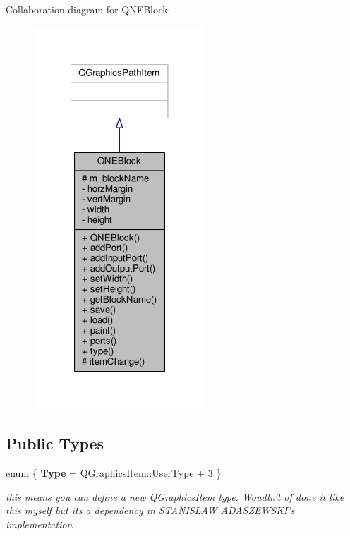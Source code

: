 Collaboration diagram for Q\-N\-E\-Block\-:
\nopagebreak
\begin{figure}[H]
\begin{center}
\leavevmode
\includegraphics[width=182pt]{class_q_n_e_block__coll__graph}
\end{center}
\end{figure}
\subsection*{Public Types}
\begin{DoxyCompactItemize}
\item 
enum \{ {\bfseries Type} = Q\-Graphics\-Item\-:\-:User\-Type + 3
 \}
\begin{DoxyCompactList}\small\item\em this means you can define a new Q\-Graphics\-Item type. Woudln't of done it like this myself but its a dependency in S\-T\-A\-N\-I\-S\-L\-A\-W A\-D\-A\-S\-Z\-E\-W\-S\-K\-I's implementation \end{DoxyCompactList}\end{DoxyCompactItemize}
